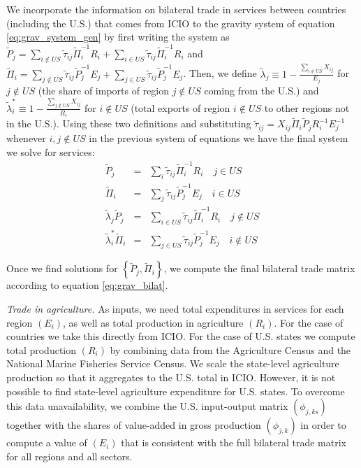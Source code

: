 \documentclass[12pt]{article}
\newcommand{\bs}{\small \begin{eqnarray*}}
\newcommand{\es}{\end{eqnarray*}}
\begin{document}
We incorporate the information on bilateral trade in services between countries (including the U.S.) that comes from ICIO to the gravity system of equation \eqref{eq:grav_system_gen} by first writing the system as $\tilde{P}_{j}  =  \sum_{i\notin US}\tilde{\tau}_{ij}\tilde{\Pi}_{i}^{-1}R_{i}+\sum_{i\in US}\tilde{\tau}_{ij}\tilde{\Pi}_{i}^{-1}R_{i}$ and $\tilde{\Pi}_{i}  =  \sum_{j\notin US}\tilde{\tau}_{ij}\tilde{P}_{j}^{-1}E_{j}+\sum_{j\in US}\tilde{\tau}_{ij}\tilde{P}_{j}^{-1}E_{j}$. Then, we define $\tilde{\lambda}_{j}\equiv1-\tfrac{\sum_{i\notin US}X_{ij}}{E_{j}}$ for $j\notin US$ (the share of imports of region $j\notin US$ coming from the U.S.) and $\tilde{\lambda}_{i}^{*}\equiv 1-\tfrac{\sum_{j\notin US}X_{ij}}{R_{i}}$ for $i\notin US$ (total exports of region $i\notin US$ to other regions not in the U.S.). Using these two definitions and substituting  $\tilde{\tau}_{ij}=X_{ij}\tilde{\Pi}_{i}\tilde{P}_{j}R_{i}^{-1}E_{j}^{-1}$ whenever $i,j \notin US$ in the previous system of equations we have the final system we solve for services:  
\bs
\tilde{P}_{j} & = & \sum_{i}\tilde{\tau}_{ij}\tilde{\Pi}_{i}^{-1}R_{i}\quad j\in US \\
\tilde{\Pi}_{i} & = &\sum_{j}\tilde{\tau}_{ij}\tilde{P}_{j}^{-1}E_{j}\quad i\in US \\
\tilde{\lambda}_{j}\tilde{P}_{j} & = & \sum_{i\in US}\tilde{\tau}_{ij}\tilde{\Pi}_{i}^{-1}R_{i}\quad j\notin US \\
\tilde{\lambda}_{i}^{*}\tilde{\Pi}_{i} & = & \sum_{j\in US}\tilde{\tau}_{ij}\tilde{P}_{j}^{-1}E_{j}\quad i\notin US
\es

Once we find solutions for  $\left\{ \tilde{P}_{j}, \tilde{\Pi}_{i} \right\}$, we compute the final bilateral trade matrix according to equation \eqref{eq:grav_bilat}.

\noindent \textit{{Trade in agriculture.}} As inputs, we need total expenditures in services for each region $(E_i)$, as well as total production in agriculture $(R_i)$. For the case of countries we take this directly from ICIO. For the case of U.S. states we compute total production $(R_i)$ by combining data from the Agriculture Census and the National Marine Fisheries Service Census. We scale the state-level agriculture production so that it aggregates to the U.S. total in ICIO. However, it is not possible to find state-level agriculture expenditure for U.S. states. To overcome this data unavailability, we combine the U.S. input-output matrix $(\phi_{j,ks})$ together with the shares of value-added in gross production $(\phi_{j,k})$ in order to compute a value of $(E_i)$ that is consistent with the full bilateral trade matrix for all regions and all sectors. 
\end{document}
